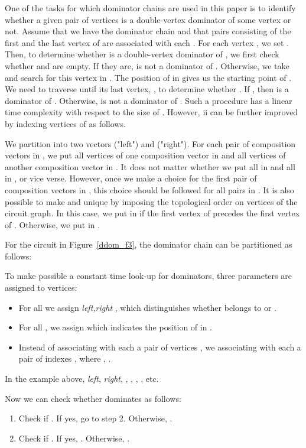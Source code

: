 \documentclass{llncs}
\begin{document}
One of the tasks for which dominator chains are used in this paper is to
identify whether a given pair of vertices  is a
double-vertex dominator of some vertex  or not. 
Assume that we have the dominator chain  and 
that pairs  consisting of the first
and the last vertex of  are associated with each .
For each vertex ,  we set . 
Then, to determine whether  is a
double-vertex dominator of ,  we first check whether  and  are empty.
If they are,  is not a dominator of . Otherwise,
we take  and search for this vertex in . The position of  in 
 gives us the starting point of . We need to traverse  until its last vertex, ,
to determine whether .  If , then  is a dominator of . Otherwise,  is not a dominator of . 
Such a procedure has a linear time complexity with respect to the size of . 
However, ii can be further improved by indexing vertices of  as follows.



We partition  into two vectors  ("left") and  ("right").
For each pair of composition vectors  in ,
we put all vertices of one composition vector in   and all vertices of another composition vector  in .
It does not matter whether we put all  in  and all  in 
, or vice verse. However, once we make a choice for the first pair of  composition vectors in  ,
this choice should be followed for all  pairs in . It is also possible to make  and 
unique by imposing the topological order on vertices of the circuit graph. In this case,
we put  in   
if the first vertex of  precedes the first vertex of .
Otherwise, we put  in .  

For the circuit in Figure~\ref{ddom_f3}, the dominator chain can be partitioned as follows:


To make possible a constant time look-up for dominators, three
parameters are assigned to vertices:
\begin{itemize}
\item
For all  we assign  {\em left,right} , which distinguishes
whether  belongs to  or .  
\item
For all ,  we assign  which
indicates the position of  in .  
\item
Instead of associating with
each  a pair of vertices , we associating with
each   a pair of indexes , where
, . 
\end{itemize}

In the example above,  {\em left},  {\em right}, 
, , 
, , etc.

Now we can check whether  dominates  as
follows:
\begin{enumerate}
\item
Check if .
If yes, go to step 2. Otherwise, .
\item Check if . If yes,
. Otherwise, .
\end{enumerate}
\end{document}
